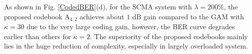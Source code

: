 \documentclass[journal]{IEEEtran}
\begin{document}
 As shown in Fig.  \ref{CodedBER}(d), for the  SCMA system with $\lambda = 200\%$,   the proposed codebook $\text{A}_{4,2}$ achieves about $1$ dB gain compared to the GAM with $\kappa = 30$ due to the very large coding gain, however, the BER curve degrades   earlier than others for    $\kappa=2$. The  superiority of  the proposed codebooks mainly   lies in  the huge reduction of complexity, especially in largely  overloaded system.
 

 

\end{document}
